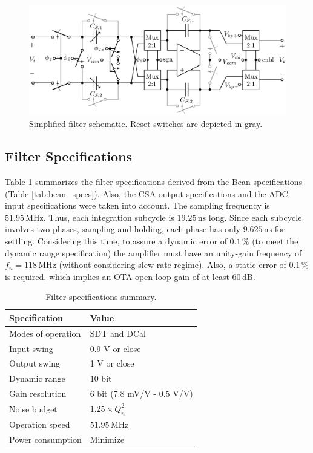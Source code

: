 \begin{figure}[!t]
	\centering
	\includegraphics[width=6in]{./Figures/Filter/filter_post.eps}
	\caption{Simplified filter schematic. Reset switches are depicted in gray.}\label{fig:filter_post}
\end{figure}

\subsection{Filter Specifications}

Table \ref{tab:filter_specs} summarizes the filter specifications derived from the Bean specifications (Table \ref{tab:bean_specs}). Also, the CSA output specifications and the ADC input specifications were taken into account. The sampling frequency is $51.95\,\text{MHz}$. Thus, each integration subcycle is $19.25\,\text{ns}$ long. Since each subcycle involves two phases, sampling and holding, each phase has only $9.625\,\text{ns}$ for settling. Considering this time, to assure a dynamic error of $0.1\,\%$ (to meet the dynamic range specification) the amplifier must have an \mbox{unity-gain} frequency of $f_u = 118\,\text{MHz}$ (without considering slew-rate regime). Also, a static error of $0.1\,\%$ is required, which implies an OTA open-loop gain of at least $60\,\text{dB}$. 

\begin{table}[!t]
	\begin{center}
		\begin{tabular}{|l|l|}\hline
			{\bf Specification} & {\bf Value} \\ \hline\hline
			Modes of operation & SDT and DCal \\ \hline
			Input swing & 0.9 V or close \\ \hline
			Output swing & 1 V or close \\ \hline
			Dynamic range & 10 bit \\ \hline
			Gain resolution & 6 bit (7.8 mV/V - 0.5 V/V) \\ \hline
			Noise budget & $1.25\times Q_n^2$ \\ \hline
			Operation speed & $51.95\,\text{MHz}$ \\ \hline
			Power consumption & Minimize\\\hline
		\end{tabular}
		\vspace*{5pt}
		\caption{Filter specifications summary.}\label{tab:filter_specs}
	\end{center}
\end{table}

